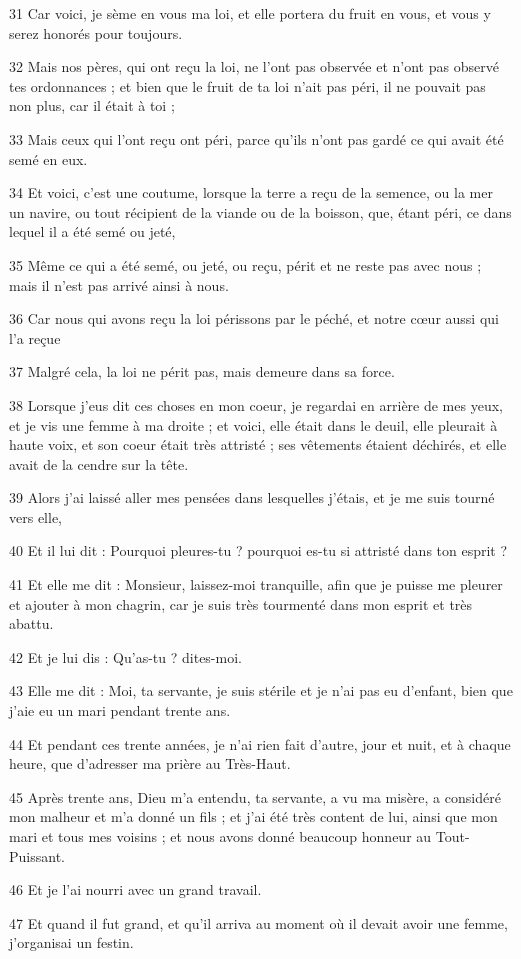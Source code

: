 \par 31 Car voici, je sème en vous ma loi, et elle portera du fruit en vous, et vous y serez honorés pour toujours.
\par 32 Mais nos pères, qui ont reçu la loi, ne l'ont pas observée et n'ont pas observé tes ordonnances ; et bien que le fruit de ta loi n'ait pas péri, il ne pouvait pas non plus, car il était à toi ;
\par 33 Mais ceux qui l'ont reçu ont péri, parce qu'ils n'ont pas gardé ce qui avait été semé en eux.
\par 34 Et voici, c'est une coutume, lorsque la terre a reçu de la semence, ou la mer un navire, ou tout récipient de la viande ou de la boisson, que, étant péri, ce dans lequel il a été semé ou jeté,
\par 35 Même ce qui a été semé, ou jeté, ou reçu, périt et ne reste pas avec nous ; mais il n'est pas arrivé ainsi à nous.
\par 36 Car nous qui avons reçu la loi périssons par le péché, et notre cœur aussi qui l'a reçue
\par 37 Malgré cela, la loi ne périt pas, mais demeure dans sa force.
\par 38 Lorsque j'eus dit ces choses en mon coeur, je regardai en arrière de mes yeux, et je vis une femme à ma droite ; et voici, elle était dans le deuil, elle pleurait à haute voix, et son coeur était très attristé ; ses vêtements étaient déchirés, et elle avait de la cendre sur la tête.
\par 39 Alors j'ai laissé aller mes pensées dans lesquelles j'étais, et je me suis tourné vers elle,
\par 40 Et il lui dit : Pourquoi pleures-tu ? pourquoi es-tu si attristé dans ton esprit ?
\par 41 Et elle me dit : Monsieur, laissez-moi tranquille, afin que je puisse me pleurer et ajouter à mon chagrin, car je suis très tourmenté dans mon esprit et très abattu.
\par 42 Et je lui dis : Qu'as-tu ? dites-moi.
\par 43 Elle me dit : Moi, ta servante, je suis stérile et je n'ai pas eu d'enfant, bien que j'aie eu un mari pendant trente ans.
\par 44 Et pendant ces trente années, je n'ai rien fait d'autre, jour et nuit, et à chaque heure, que d'adresser ma prière au Très-Haut.
\par 45 Après trente ans, Dieu m'a entendu, ta servante, a vu ma misère, a considéré mon malheur et m'a donné un fils ; et j'ai été très content de lui, ainsi que mon mari et tous mes voisins ; et nous avons donné beaucoup honneur au Tout-Puissant.
\par 46 Et je l'ai nourri avec un grand travail.
\par 47 Et quand il fut grand, et qu'il arriva au moment où il devait avoir une femme, j'organisai un festin.

